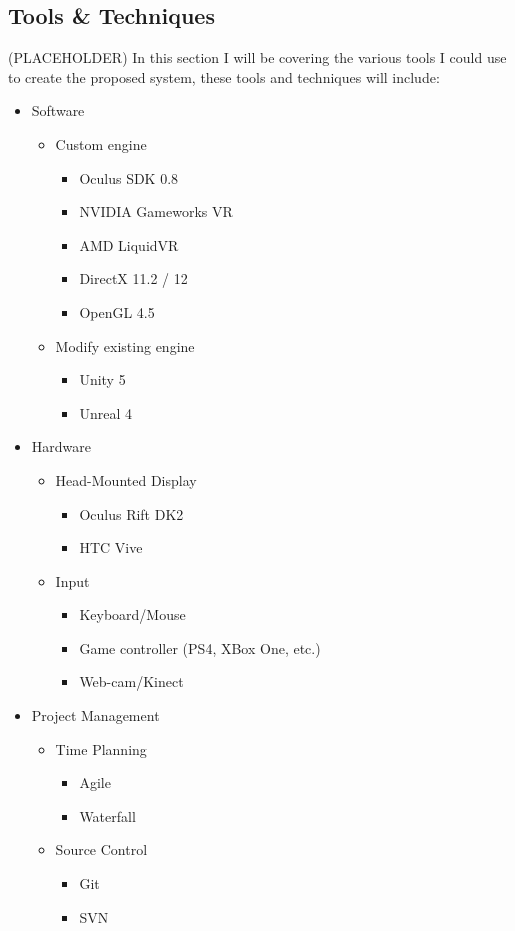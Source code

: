 	\subsection{Tools \& Techniques}
	\label{lr:cross:tools}

		(PLACEHOLDER) In this section I will be covering the various tools I could use to create the proposed system, these tools and techniques will include:
		\begin{itemize}
			\item Software 
			\begin{itemize}
				\item Custom engine
				\begin{itemize}
					\item Oculus SDK 0.8
					\item NVIDIA Gameworks VR
					\item AMD LiquidVR
					\item DirectX 11.2 / 12
					\item OpenGL 4.5
				\end{itemize}
				\item Modify existing engine
				\begin{itemize}
					\item Unity 5
					\item Unreal 4
				\end{itemize}
			\end{itemize}
			\item Hardware
			\begin{itemize}
				\item Head-Mounted Display
				\begin{itemize}
					\item Oculus Rift DK2
					\item HTC Vive
				\end{itemize}
				\item Input
				\begin{itemize}
					\item Keyboard/Mouse
					\item Game controller (PS4, XBox One, etc.)
					\item Web-cam/Kinect
				\end{itemize}
			\end{itemize}
			\item Project Management
			\begin{itemize}
				\item Time Planning
				\begin{itemize}
					\item Agile
					\item Waterfall
				\end{itemize}
				\item Source Control
				\begin{itemize}
					\item Git
					\item SVN
				\end{itemize}
			\end{itemize}
		\end{itemize}
